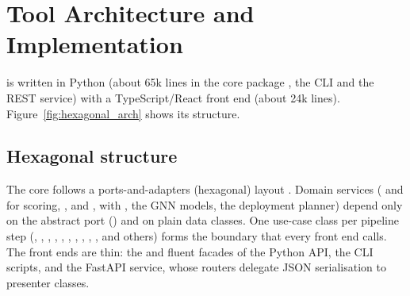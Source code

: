 \section{Tool Architecture and Implementation}
\label{sec:architecture}

\sag{} is written in Python (about 65k lines in the core package , the CLI and the REST service) with a TypeScript/React front end (about 24k lines). Figure~\ref{fig:hexagonal_arch} shows its structure.

\subsection{Hexagonal structure}
\label{sec:arch:hexagonal}

The core follows a ports-and-adapters (hexagonal) layout \citep{martin2003agile}. Domain services ( and  for scoring, ,  and ,  with , the GNN models, the deployment planner) depend only on the abstract port  () and on plain data classes. One use-case class per pipeline step (, , , , , , , , , , and others) forms the boundary that every front end calls. The front ends are thin: the  and fluent  facades of the Python API, the CLI scripts, and the FastAPI service, whose routers delegate JSON serialisation to presenter classes.

